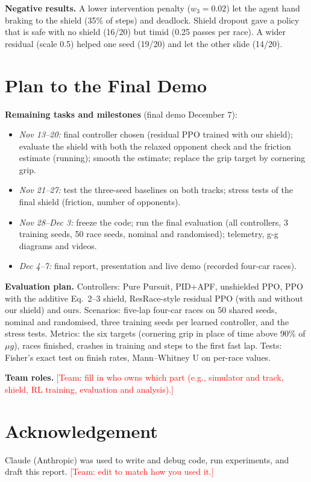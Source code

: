 \documentclass[conference]{IEEEtran}
\newcommand{\todo}[1]{\textcolor{red}{[#1]}}
\begin{document}
\textbf{Negative results.} A lower intervention penalty ($w_3 = 0.02$) let the agent hand braking to the
shield (35\% of steps) and deadlock. Shield dropout gave a policy that is safe with no shield (16/20) but timid
(0.25 passes per race). A wider residual (scale 0.5) helped one seed (19/20) and let the other slide (14/20).

\section{Plan to the Final Demo}
\textbf{Remaining tasks and milestones} (final demo December 7):
\begin{itemize}
\item \emph{Nov 13--20:} final controller chosen (residual PPO trained with our shield); evaluate the shield with
both the relaxed opponent check and the friction estimate (running); smooth the estimate; replace the grip
target by cornering grip.
\item \emph{Nov 21--27:} test the three-seed baselines on both tracks; stress tests of the final shield (friction,
number of opponents).
\item \emph{Nov 28--Dec 3:} freeze the code; run the final evaluation (all controllers, 3 training seeds, 50 race
seeds, nominal and randomised); telemetry, g-g diagrams and videos.
\item \emph{Dec 4--7:} final report, presentation and live demo (recorded four-car races).
\end{itemize}
\textbf{Evaluation plan.} Controllers: Pure Pursuit, PID+APF, unshielded PPO, PPO with the additive Eq.~2--3
shield, ResRace-style residual PPO (with and without our shield) and ours. Scenarios: five-lap four-car races on
50 shared seeds, nominal and randomised, three training seeds per learned controller, and the stress tests.
Metrics: the six targets (cornering grip in place of time above 90\% of $\mu g$), races finished, crashes in
training and steps to the first fast lap. Tests: Fisher's exact test on finish rates, Mann--Whitney U
on per-race values.

\textbf{Team roles.} \todo{Team: fill in who owns which part (e.g., simulator and track, shield, RL training,
evaluation and analysis).}

\section*{Acknowledgement}
Claude (Anthropic) was used to write and debug code, run experiments, and draft this report. \todo{Team: edit to
match how you used it.}
\end{document}
